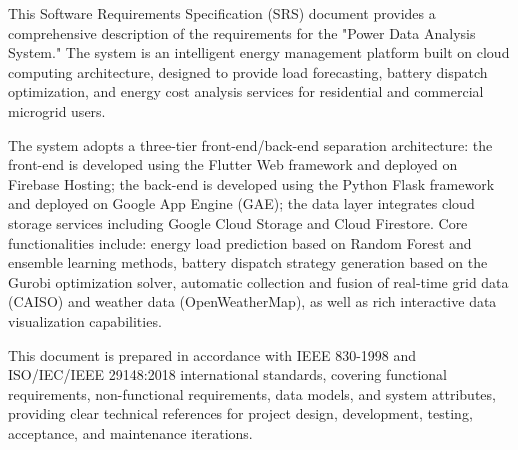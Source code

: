 \begin{abstract}
  本需求规格说明书详细描述了"电力数据分析系统"的软件需求规格。该系统是一个基于云计算架构的智能能源管理平台，旨在为家庭及商业微电网用户提供负载预测、电池调度优化和能源成本分析服务。

  系统采用前后端分离的三层架构设计：前端基于 Flutter Web 框架开发，部署于 Firebase Hosting；后端基于 Python Flask 框架开发，部署于 Google App Engine (GAE)；数据层则整合了 Google Cloud Storage 和 Cloud Firestore 等云存储服务。核心功能包括：基于随机森林和集成学习的能源负载预测、基于 Gurobi 优化求解器的电池调度策略生成、实时电网数据（CAISO）和天气数据（OpenWeatherMap）的自动采集与融合，以及丰富的交互式数据可视化功能。

  本文档遵循 IEEE 830-1998 和 ISO/IEC/IEEE 29148:2018 国际标准编写，涵盖系统功能性需求、非功能性需求、数据模型及系统属性等方面，为项目的设计开发、测试验收和维护迭代提供明确的技术依据。

\end{abstract}

\begin{abstract*}
  This Software Requirements Specification (SRS) document provides a comprehensive description of the requirements for the "Power Data Analysis System." The system is an intelligent energy management platform built on cloud computing architecture, designed to provide load forecasting, battery dispatch optimization, and energy cost analysis services for residential and commercial microgrid users.

  The system adopts a three-tier front-end/back-end separation architecture: the front-end is developed using the Flutter Web framework and deployed on Firebase Hosting; the back-end is developed using the Python Flask framework and deployed on Google App Engine (GAE); the data layer integrates cloud storage services including Google Cloud Storage and Cloud Firestore. Core functionalities include: energy load prediction based on Random Forest and ensemble learning methods, battery dispatch strategy generation based on the Gurobi optimization solver, automatic collection and fusion of real-time grid data (CAISO) and weather data (OpenWeatherMap), as well as rich interactive data visualization capabilities.

  This document is prepared in accordance with IEEE 830-1998 and ISO/IEC/IEEE 29148:2018 international standards, covering functional requirements, non-functional requirements, data models, and system attributes, providing clear technical references for project design, development, testing, acceptance, and maintenance iterations.

\end{abstract*}
